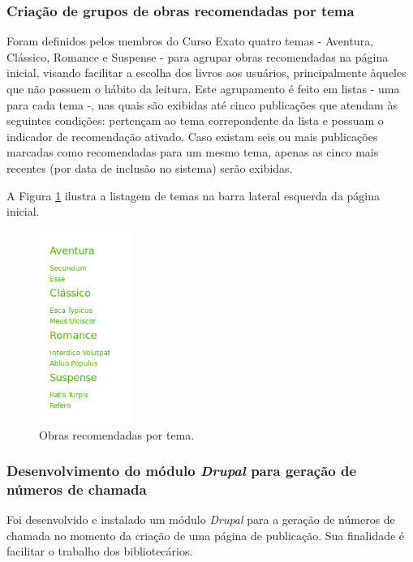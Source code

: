 \documentclass[a4paper]{article}
\begin{document}
\subsubsection{Criação de grupos de obras recomendadas por tema}\label{sssec:srecommended}
Foram definidos pelos membros do Curso Exato quatro temas - Aventura, Clássico, Romance e Suspense - para agrupar obras recomendadas na página inicial, visando facilitar a escolha dos livros aos usuários, principalmente àqueles que não possuem o hábito da leitura. Este agrupamento é feito em listas - uma para cada tema -, nas quais são exibidas até cinco publicações que atendam às seguintes condições: pertençam ao tema correpondente da lista e possuam o indicador de recomendação ativado. Caso existam seis ou mais publicações marcadas como recomendadas para um mesmo tema, apenas as cinco mais recentes (por data de inclusão no sistema) serão exibidas.

A Figura \ref{recommended} ilustra a listagem de temas na barra lateral esquerda da página inicial.

\begin{figure}[pbth!]
\centering
\includegraphics[width=30mm]{img/leftsidebar-close.png}
\caption{Obras recomendadas por tema.\label{recommended}}
\end{figure}

\subsubsection{Desenvolvimento do módulo \textit{Drupal} para geração de números de chamada}\label{sssec:chamada}

Foi desenvolvido e instalado um módulo \textit{Drupal} para a geração de números de chamada no momento da criação de uma página de publicação. Sua finalidade é facilitar o trabalho dos bibliotecários.
\end{document}
